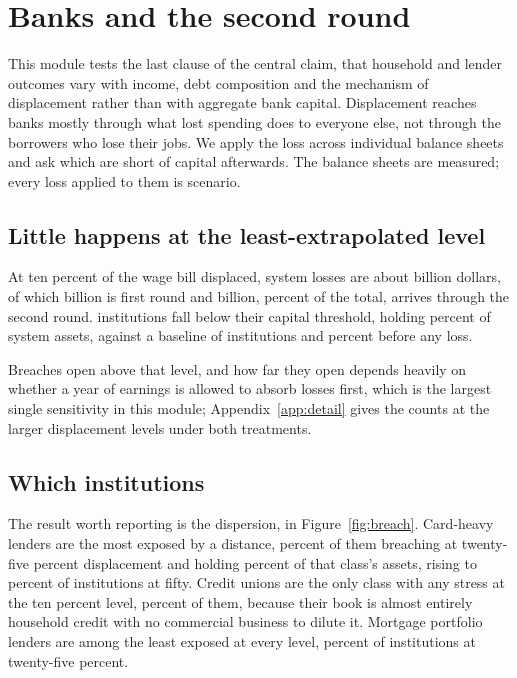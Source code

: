 \section{Banks and the second round}
\label{sec:banks}

This module tests the last clause of the central claim, that household and lender outcomes vary
with income, debt composition and the mechanism of displacement rather than with aggregate bank
capital. Displacement reaches banks mostly through what lost spending does to everyone else, not
through the borrowers who lose their jobs. We apply the loss across 
individual balance sheets and ask which are short of capital afterwards. The balance sheets are
measured; every loss applied to them is scenario.

\subsection{Little happens at the least-extrapolated level}

At ten percent of the wage bill displaced, system losses are about  billion
dollars, of which  billion is first round and  billion,
 percent of the total, arrives through the second round.
 institutions fall below their capital threshold, holding
 percent of system assets, against a baseline of
 institutions and  percent before any loss.

Breaches open above that level, and how far they open depends heavily on whether a year of
earnings is allowed to absorb losses first, which is the largest single sensitivity in this
module; Appendix~\ref{app:detail} gives the counts at the larger displacement levels under both
treatments.

\subsection{Which institutions}

The result worth reporting is the dispersion, in Figure~\ref{fig:breach}. Card-heavy lenders are
the most exposed by a distance,  percent of them breaching at
twenty-five percent displacement and holding  percent of that
class's assets, rising to  percent of institutions at fifty. Credit
unions are the only class with any stress at the ten percent level,
 percent of them, because their book is almost entirely household
credit with no commercial business to dilute it. Mortgage portfolio lenders are among the least
exposed at every level,  percent of institutions at
twenty-five percent.

